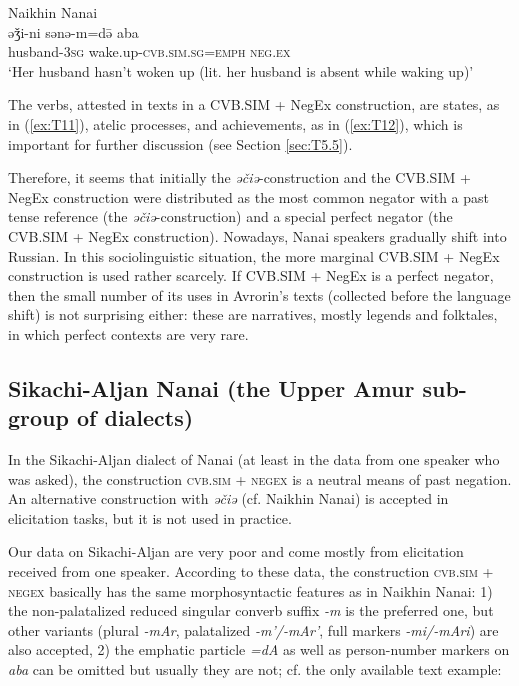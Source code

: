 \documentclass[output=paper]{langscibook}
\begin{document}
\ea Naikhin Nanai \label{ex:T12}\\
	\gll əǯi-ni	sənə-m=də̄	aba\\
	husband-\textsc{3sg}	wake.up-\textsc{cvb.sim.sg=emph}	\textsc{neg.ex}\\
	\glt `Her husband hasn’t woken up (lit. her husband is absent while waking up)' \citep[209, text]{avrorin1986a}
\z

The verbs, attested in texts in a CVB.SIM + NegEx construction, are states, as in (\ref{ex:T11}), atelic processes, and achievements, as in (\ref{ex:T12}), which is important for further discussion (see Section \ref{sec:T5.5}).

Therefore, it seems that initially the \textit{əčiə}-construction and the CVB.SIM + NegEx construction were distributed as the most common negator with a past tense reference (the \textit{əčiə}-construction) and a special perfect negator (the CVB.SIM + NegEx construction). Nowadays, Nanai speakers gradually shift into Russian. In this sociolinguistic situation, the more marginal CVB.SIM + NegEx construction is used rather scarcely. If CVB.SIM + NegEx is a perfect negator, then the small number of its uses in Avrorin’s texts (collected before the language shift) is not surprising either: these are narratives, mostly legends and folktales, in which perfect contexts are very rare.

\subsection{Sikachi-Aljan Nanai (the Upper Amur sub-group of dialects)}\label{sec:T5.2}

In the Sikachi-Aljan dialect of Nanai (at least in the data from one speaker who was asked), the construction \textsc{cvb.sim + negex} is a neutral means of past negation. An alternative construction with \textit{əčiə} (cf. Naikhin Nanai) is accepted in elicitation tasks, but it is not used in practice.

Our data on Sikachi-Aljan are very poor and come mostly from elicitation received from one speaker. According to these data, the construction \textsc{cvb.sim + negex} basically has the same morphosyntactic features as in Naikhin Nanai: 1) the non-palatalized reduced singular converb suffix \textit{-m} is the preferred one, but other variants (plural \textit{-mAr}, palatalized ­\textit{-m’/-mAr’}, full markers \textit{-mi/-mAri}) are also accepted, 2) the emphatic particle \textit{=dA} as well as person-number markers on \textit{aba} can be omitted but usually they are not; cf. the only available text example:
\end{document}
